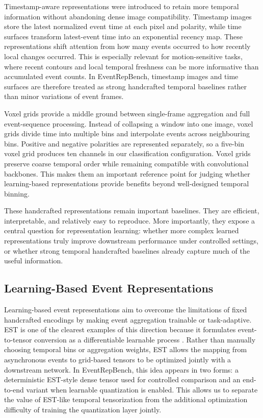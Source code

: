 \documentclass[letterpaper]{article}
\begin{document}
Timestamp-aware representations were introduced to retain more temporal information without abandoning dense image compatibility. Timestamp images store the latest normalized event time at each pixel and polarity, while time surfaces transform latest-event time into an exponential recency map. These representations shift attention from how many events occurred to how recently local changes occurred. This is especially relevant for motion-sensitive tasks, where recent contours and local temporal freshness can be more informative than accumulated event counts. In EventRepBench, timestamp images and time surfaces are therefore treated as strong handcrafted temporal baselines rather than minor variations of event frames.

Voxel grids provide a middle ground between single-frame aggregation and full event-sequence processing. Instead of collapsing a window into one image, voxel grids divide time into multiple bins and interpolate events across neighbouring bins. Positive and negative polarities are represented separately, so a five-bin voxel grid produces ten channels in our classification configuration. Voxel grids preserve coarse temporal order while remaining compatible with convolutional backbones. This makes them an important reference point for judging whether learning-based representations provide benefits beyond well-designed temporal binning.

These handcrafted representations remain important baselines. They are efficient, interpretable, and relatively easy to reproduce. More importantly, they expose a central question for representation learning: whether more complex learned representations truly improve downstream performance under controlled settings, or whether strong temporal handcrafted baselines already capture much of the useful information.

\subsection{Learning-Based Event Representations}
Learning-based event representations aim to overcome the limitations of fixed handcrafted encodings by making event aggregation trainable or task-adaptive. EST is one of the clearest examples of this direction because it formulates event-to-tensor conversion as a differentiable learnable process \cite{gehrig2019est}. Rather than manually choosing temporal bins or aggregation weights, EST allows the mapping from asynchronous events to grid-based tensors to be optimized jointly with a downstream network. In EventRepBench, this idea appears in two forms: a deterministic EST-style dense tensor used for controlled comparison and an end-to-end variant when learnable quantization is enabled. This allows us to separate the value of EST-like temporal tensorization from the additional optimization difficulty of training the quantization layer jointly.
\end{document}

